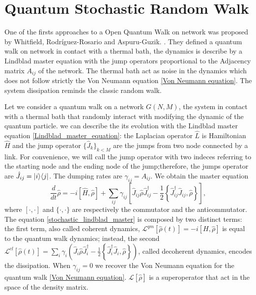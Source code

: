 \section{Quantum Stochastic Random Walk}\label{C_Quantum Stochastic Walk}

One of the firsts approaches to a Open Quantum Walk on network was proposed by Whitfield, Rodr\'iguez-Rosario and Aspuru-Guzik. \cite{QSW}. They defined a quantum walk on network in contact with a thermal bath, the dynamics is describe by a Lindblad master equation with the jump operators proportional to the Adjacency matrix $A_{ij}$ of the network. The thermal bath act as noise in the dynamics which does not follow strictly the Von Neumann equation \eqref{Von Neumann equation}. The system dissipation reminds the classic random walk.

Let we consider a quantum walk on a network $G(N,M)$, the system in contact with a thermal bath that randomly interact with modifying the dynamic of the quantum particle. we can describe the its evolution with the Lindblad master equation \eqref{Lindblad_master_equation}: the Laplacian operator $\hat L$ is Hamiltonian $\hat H$ and the jump operator $\{\hat J_k\}_{k<M}$ are the jumps from two node connected by a link. For convenience, we will call the jump operator with two indeces referring to the starting node and the ending node of the jump;therefore, the jumps operator are $\hat J_{ij} = \lvert i\rangle\langle j\rvert$. The dumping rates are $\gamma_{ij} =A_{ij}$.
We obtain the master equation
\begin{equation}\label{stochastic_lindblad_master}
    \frac{d}{dt}\hat \rho = -i\left[\hat H,\hat\rho\right] + \sum_{ij}\gamma_{ij}\left[\hat J_{ij} \hat\rho\hat J_{ij}^\dagger -\frac{1}{2} \left\{ \hat J_{ij}^\dagger \hat J_{ij}, \hat\rho\right\}\right],
\end{equation}
where $[\cdot,\cdot]$ and $\{\cdot,\cdot\}$ are respectively the commutator and the anticommutator.
The equation \eqref{stochastic_lindblad_master} is composed by two distinct terms: the first term, also called coherent dynamics,
$\mathcal{L}^{qm}\left[\hat\rho(t)\right] = -i\left[H,\hat\rho\right]$ is equal to the quantum walk dynamics; instead, the second $\mathcal{L}^{cl}\left[\hat\rho(t)\right] = \sum_i \gamma_i \left(\hat J_i \hat\rho \hat J^\dagger_i - \frac{1}{2}\left\{ \hat J^\dagger_i\hat J_i, \hat\rho\right\} \right)$, called decoherent dynamics, encodes the dissipation. 
When $\gamma_{ij} = 0$ we recover the Von Neumann equation for the quantum walk \eqref{Von Neumann equation}. 
$\mathcal{L}\left[\hat\rho\right]$ is a superoperator that act in the space of the density matrix.

